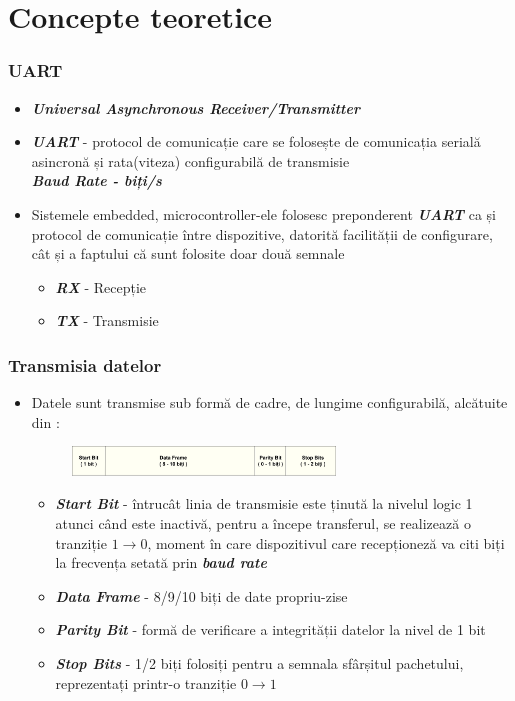 \documentclass[xcolor={table}]{beamer}
\begin{document}
	\section{Concepte teoretice}
	\begin{frame}
		\frametitle{UART}
		\begin{itemize}
		    \item \textbf{\textit{Universal Asynchronous Receiver/Transmitter}}
		    \item \textbf{\textit{UART}} - protocol de comunicație care se folosește de comunicația serială asincronă și rata(viteza) configurabilă de transmisie \\
		    \textbf{\textit{Baud Rate - biți/s}}
		    \item Sistemele embedded, microcontroller-ele folosesc preponderent \textbf{\textit{UART}} ca și protocol de comunicație între dispozitive, datorită facilității de configurare, cât și a faptului că sunt folosite doar două semnale
		    \begin{itemize}
		        \item \textbf{\textit{RX}} - Recepție
		        \item \textbf{\textit{TX}} - Transmisie
		    \end{itemize}
		\end{itemize}
	\end{frame}
		\begin{frame}
		\frametitle{Transmisia datelor}
		\begin{itemize}
		    \item Datele sunt transmise sub formă de cadre, de lungime configurabilă, alcătuite din : \\
		    \begin{figure}
		        \centering
		        \includegraphics[width=7cm]{images/cadru.png}
		    \end{figure}
		    \begin{itemize}
		        \item \textbf{\textit{Start Bit}} - întrucât linia de transmisie este ținută la nivelul logic 1 atunci când este inactivă, pentru a începe transferul, se realizează o tranziție \textbf{$ 1 \rightarrow 0$}, moment în care dispozitivul care recepționeză va citi biți la frecvența setată prin \textbf{\textit{baud rate}}
		        \item \textbf{\textit{Data Frame}} - 8/9/10 biți de date propriu-zise
		        \item \textbf{\textit{Parity Bit}} - formă de verificare a integrității datelor la nivel de 1 bit
		        \item \textbf{\textit{Stop Bits}} - 1/2 biți folosiți pentru a semnala sfârșitul pachetului, reprezentați printr-o tranziție \textbf{$0 \rightarrow 1 $}
		    \end{itemize}
		\end{itemize}
		\end{frame}
\end{document}
